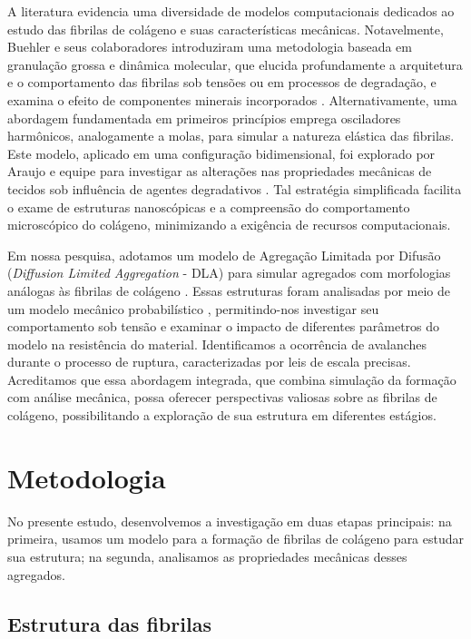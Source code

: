 \documentclass{article}
\begin{document}
    A literatura evidencia uma diversidade de modelos computacionais dedicados ao estudo das fibrilas de colágeno e suas características 
    mecânicas. Notavelmente, Buehler e seus colaboradores introduziram uma metodologia baseada em granulação grossa e dinâmica molecular, 
    que elucida profundamente a arquitetura e o comportamento das fibrilas sob tensões ou em processos de degradação, e examina o efeito 
    de componentes minerais incorporados \cite{B1,B2,B3,B4,Malaspina2017-qp,10.1002/jbmr.2705}. Alternativamente, uma abordagem fundamentada 
    em primeiros princípios emprega osciladores harmônicos, analogamente a molas, para simular a natureza elástica das fibrilas. Este modelo, 
    aplicado em uma configuração bidimensional, foi explorado por Araujo e equipe para investigar as alterações nas propriedades mecânicas 
    de tecidos sob influência de agentes degradativos \cite{Araujo}. Tal estratégia simplificada facilita o exame de estruturas nanoscópicas 
    e a compreensão do comportamento microscópico do colágeno, minimizando a exigência de recursos computacionais. 

    Em nossa pesquisa, adotamos um modelo de Agregação Limitada por Difusão (\textit{Diffusion Limited Aggregation} - DLA) para simular 
    agregados com morfologias análogas às fibrilas de colágeno \cite{Parkinson1995}. Essas estruturas foram analisadas por meio de um modelo 
    mecânico probabilístico \cite{Parkinson1997}, permitindo-nos investigar seu comportamento sob tensão e examinar o impacto de diferentes 
    parâmetros do modelo na resistência do material. Identificamos a ocorrência de avalanches durante o processo de ruptura, caracterizadas 
    por leis de escala precisas. Acreditamos que essa abordagem integrada, que combina simulação da formação com análise mecânica, possa 
    oferecer perspectivas valiosas sobre as fibrilas de colágeno, possibilitando a exploração de sua estrutura em diferentes estágios. 


\section{Metodologia}

    No presente estudo, desenvolvemos a investigação em duas etapas principais: na primeira, usamos um modelo para a formação de 
    fibrilas de colágeno para estudar sua estrutura; na segunda, analisamos as propriedades mecânicas desses agregados. 

    \subsection{Estrutura das fibrilas}
\end{document}
